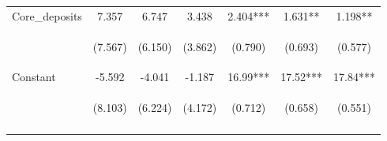 \documentclass[]{article}
\begin{document}
\begin{center}
\begin{tabular}{lcccccc}
Core\_deposits & 7.357 & 6.747 & 3.438 & 2.404*** & 1.631** & 1.198** \\
\vspace{4pt} & \begin{footnotesize}(7.567)\end{footnotesize} & \begin{footnotesize}(6.150)\end{footnotesize} & \begin{footnotesize}(3.862)\end{footnotesize} & \begin{footnotesize}(0.790)\end{footnotesize} & \begin{footnotesize}(0.693)\end{footnotesize} & \begin{footnotesize}(0.577)\end{footnotesize} \\
Constant & -5.592 & -4.041 & -1.187 & 16.99*** & 17.52*** & 17.84*** \\
 & \begin{footnotesize}(8.103)\end{footnotesize} & \begin{footnotesize}(6.224)\end{footnotesize} & \begin{footnotesize}(4.172)\end{footnotesize} & \begin{footnotesize}(0.712)\end{footnotesize} & \begin{footnotesize}(0.658)\end{footnotesize} & \begin{footnotesize}(0.551)\end{footnotesize} \\
\vspace{4pt} & \begin{footnotesize}\end{footnotesize} & \begin{footnotesize}\end{footnotesize} & \begin{footnotesize}\end{footnotesize} & \begin{footnotesize}\end{footnotesize} & \begin{footnotesize}\end{footnotesize} & \begin{footnotesize}\end{footnotesize} \\

\end{tabular}
\end{center}
\end{document}
